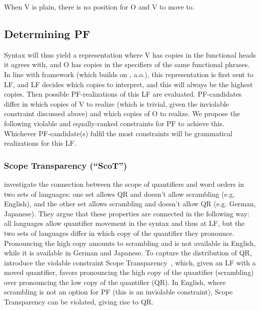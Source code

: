 \documentclass[output=paper]{langscibook}
\begin{document}
When V is plain, there is no position for O and V to move to.

\subsection{Determining PF} 
\label{lasz:sec:23}

Syntax will thus yield a representation where V has copies in the
functional heads it agrees with, and O has copies in the specifiers of
the same functional phrases. In line with  
framework (which builds on \citealp{Bobaljik.1995,Bobaljik.2002,Brody.1995,ErteschikShir.1997}, a.o.), 
this representation is first sent to LF, and
LF decides which copies to interpret, and this will always be the
highest copies. Then possible PF-realizations of this LF are evaluated.
PF-candidates differ in which copies of V to realize (which is trivial,
given the inviolable constraint discussed above) and which copies of
O to realize. We propose the following violable and equally-ranked
constraints for PF to achieve this. Whichever PF-candidate(s) fulfil the most constraints will
be grammatical realizations for this LF.

\subsubsection{Scope Transparency (``ScoT'')}

\citet{Bobaljik.Wurmbrand.2012} investigate the connection between the
scope of quantifiers and word orders in two sets of languages: one set
allows QR and doesn’t allow scrambling (e.g. English), and the other
set allows scrambling and doesn’t allow QR (e.g. German, Japanese).
They argue that these properties are connected in the following way:
all languages allow quantifier movement in the syntax and thus at LF,
but the two sets of languages differ in which copy of the quantifier
they pronounce. Pronouncing the high copy amounts to scrambling
and is not available in English, while it is available in German and
Japanese. To capture the distribution of QR, \citeauthor{Bobaljik.Wurmbrand.2012} introduce the
violable constraint Scope Transparency~, which, given an LF with
a moved quantifier, favors pronouncing the high copy of the quantifier
(scrambling) over pronouncing the low copy of the quantifier (QR). In
English, where scrambling is not an option for PF (this is an inviolable
constraint), Scope Transparency can be violated, giving rise to QR.
\end{document}
